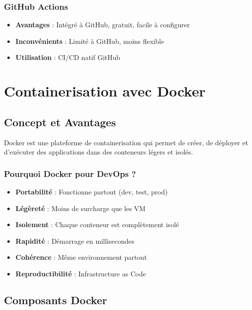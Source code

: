 \documentclass[12pt,a4paper]{report}
\begin{document}
\subsubsection{GitHub Actions}

\begin{itemize}
    \item \textbf{Avantages} : Intégré à GitHub, gratuit, facile à configurer
    \item \textbf{Inconvénients} : Limité à GitHub, moins flexible
    \item \textbf{Utilisation} : CI/CD natif GitHub
\end{itemize}

\newpage

\section{Containerisation avec Docker}

\subsection{Concept et Avantages}

Docker est une plateforme de containerisation qui permet de créer, de déployer et d'exécuter des applications dans des conteneurs légers et isolés.

\subsubsection{Pourquoi Docker pour DevOps ?}

\begin{itemize}
    \item \textbf{Portabilité} : Fonctionne partout (dev, test, prod)
    \item \textbf{Légèreté} : Moins de surcharge que les VM
    \item \textbf{Isolement} : Chaque conteneur est complètement isolé
    \item \textbf{Rapidité} : Démarrage en millisecondes
    \item \textbf{Cohérence} : Même environnement partout
    \item \textbf{Reproductibilité} : Infrastructure as Code
\end{itemize}

\subsection{Composants Docker}
\end{document}
